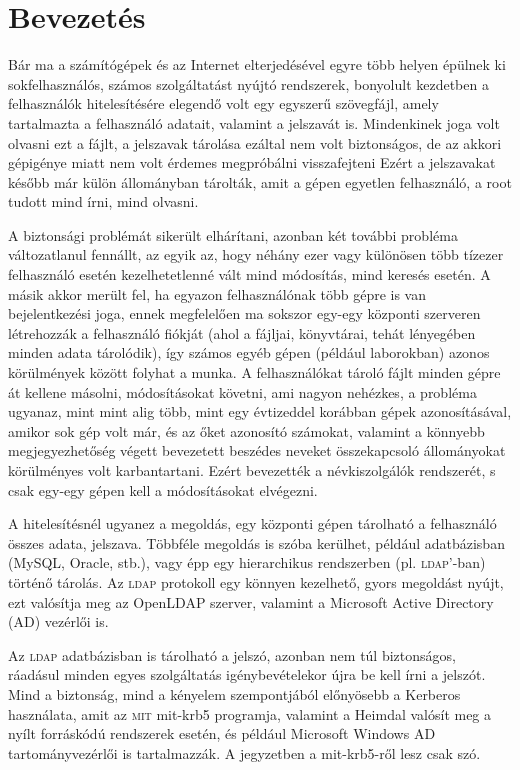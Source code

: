 \chapter{Bevezetés}

Bár ma a számítógépek és az Internet elterjedésével egyre több helyen épülnek ki sokfelhasználós, számos szolgáltatást
nyújtó rendszerek, bonyolult kezdetben a felhasználók hitelesítésére elegendő volt egy egyszerű szövegfájl, amely
tartalmazta a felhasználó adatait, valamint a jelszavát is. Mindenkinek joga volt olvasni ezt a fájlt, a jelszavak
tárolása ezáltal nem volt biztonságos, de az akkori gépigénye miatt nem volt érdemes megpróbálni visszafejteni Ezért a
jelszavakat később már külön állományban tárolták, amit a gépen egyetlen felhasználó, a root tudott mind írni, mind
olvasni.

A biztonsági problémát sikerült elhárítani, azonban két további probléma változatlanul fennállt, az egyik az, hogy
néhány ezer vagy különösen több tízezer felhasználó esetén kezelhetetlenné vált mind módosítás, mind keresés esetén. A
másik akkor merült fel, ha egyazon felhasználónak több gépre is van bejelentkezési joga, ennek megfelelően ma sokszor
egy-egy központi szerveren létrehozzák a felhasználó fiókját (ahol a fájljai, könyvtárai, tehát lényegében minden adata
tárolódik), így számos egyéb gépen (például laborokban) azonos körülmények között folyhat a munka. A felhasználókat
tároló fájlt minden gépre át kellene másolni, módosításokat követni, ami nagyon nehézkes, a probléma ugyanaz, mint  mint
alig több, mint egy évtizeddel korábban gépek azonosításával, amikor sok gép volt már, és az őket azonosító számokat,
valamint a könnyebb megjegyezhetőség végett bevezetett beszédes neveket összekapcsoló állományokat körülményes volt
karbantartani. Ezért bevezették a névkiszolgálók rendszerét, s csak egy-egy gépen kell a módosításokat elvégezni.

A hitelesítésnél ugyanez a megoldás, egy központi gépen tárolható a felhasználó összes adata, jelszava. Többféle
megoldás is szóba kerülhet, például adatbázisban (MySQL, Oracle, stb.), vagy épp egy hierarchikus rendszerben
(pl. \textsc{ldap}'-ban) történő tárolás. Az \textsc{ldap} protokoll egy könnyen kezelhető, gyors megoldást nyújt, ezt
valósítja meg az OpenLDAP szerver, valamint a Microsoft Active Directory (\textsc{AD}) vezérlői is. 

Az \textsc{ldap} adatbázisban is tárolható a jelszó, azonban nem túl biztonságos, ráadásul minden egyes szolgáltatás
igénybevételekor újra be kell írni a jelszót. Mind a biztonság, mind a kényelem szempontjából előnyösebb a Kerberos
használata, amit az \textsc{mit} mit-krb5 programja, valamint a Heimdal valósít meg a nyílt forráskódú rendszerek
esetén, és például Microsoft Windows AD tartományvezérlői is tartalmazzák. A jegyzetben a mit-krb5-ről lesz csak szó.

